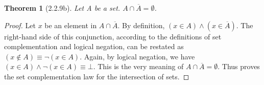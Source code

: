 \documentclass[a4paper, 12pt]{article}
\theoremstyle{plain}
\newtheorem*{theorem*}{Theorem}
\begin{document}
	
	\begin{theorem*}[2.2.9b]
		Let A be a set. $A \cap \overline{A} = \emptyset$.
	\end{theorem*}
	
	\begin{proof}
		Let $x$ be an element in $A \cap \overline{A}$. By definition, 
		$(x \in A) \land (x \in \overline{A})$. The right-hand side of this conjunction, according to the 
		definitions of set complementation and logical negation, can be restated as 
		\newline $(x \notin A) \equiv \lnot (x \in A)$. Again, by logical negation, we have 
		\newline $(x \in A) \land \lnot (x \in A) \equiv \bot$. This is the very meaning of 
		$A \cap \overline{A} = \emptyset$. Thus proves the set complementation law for the intersection of 
		sets.
	\end{proof}
	
\end{document}

